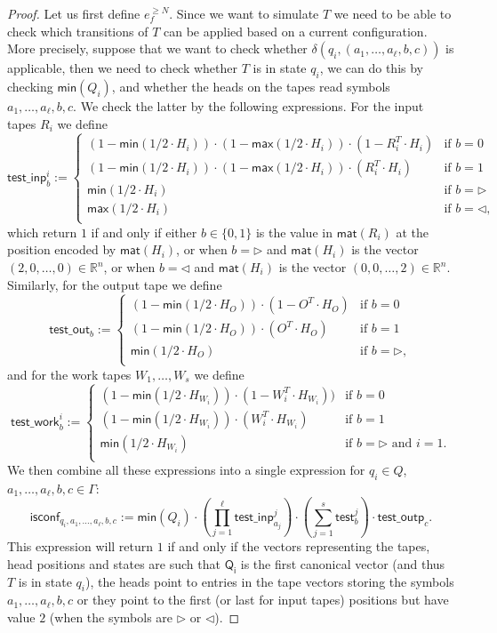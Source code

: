 \begin{proof}
Let us first define $e_f^{\geq N}$. Since we want to simulate $T$ we need to be able to check which 
transitions of $T$ can be applied based on a current configuration. More precisely,
suppose that we want to check whether $\delta(q_i,(a_1,\ldots,a_{\ell},b,c))$ is applicable, then we 
need to check whether $T$ is in state $q_i$, we can do this by checking 
$\mathsf{min}(Q_i)$, and whether the heads on the tapes read symbols $a_1,\ldots,a_{\ell},b,c$. We 
check the latter by the following expressions.
For the input tapes $R_i$ we define
$$
\mathsf{test\_inp}^i_b:=\begin{cases}
(1-\mathsf{min}(1/2\cdot H_i))\cdot(1-\mathsf{max}(1/2\cdot H_i))\cdot(1- R_i^T\cdot H_i) & \text{if $b=0$}\\
(1-\mathsf{min}(1/2\cdot H_i))\cdot(1-\mathsf{max}(1/2\cdot H_i))\cdot(R_i^T\cdot H_i) & \text{if $b=1$}\\
\mathsf{min}(1/2\cdot H_i) & \text{if $b=\rhd$}\\
\mathsf{max}(1/2\cdot H_i) & \text{if $b=\lhd$},\\
\end{cases}
$$
which return $1$ if and only if either $b\in\{0,1\}$ is the value in $\mathsf{mat}(R_i)$ at the 
position encoded by $\mathsf{mat}(H_i)$, or when $b=\rhd$ and $\mathsf{mat}(H_i)$ is the vector 
$(2,0,\ldots,0)\in\mathbb{R}^n$, or when $b=\lhd$ and $\mathsf{mat}(H_i)$ is the vector 
$(0,0,\ldots,2)\in\mathbb{R}^n$. Similarly, for the output tape we define
$$
\mathsf{test\_out}_b:=\begin{cases}
(1-\mathsf{min}(1/2\cdot H_O))\cdot(1- O^T\cdot H_O) & \text{if $b=0$}\\
(1-\mathsf{min}(1/2\cdot H_O))\cdot(O^T\cdot H_O) & \text{if $b=1$}\\
\mathsf{min}(1/2\cdot H_O) & \text{if $b=\rhd$},\\
\end{cases}
$$
and for the work tapes $W_1,\ldots,W_s$ we define
$$
\mathsf{test\_work}^i_b:=\begin{cases}
(1-\mathsf{min}(1/2\cdot H_{W_i}))\cdot(1- W_i^T\cdot H_{W_i})) & \text{if $b=0$}\\
(1-\mathsf{min}(1/2\cdot H_{W_i}))\cdot (W_i^T\cdot H_{W_i}) & \text{if $b=1$}\\
\mathsf{min}(1/2\cdot H_{W_i}) & \text{if $b=\rhd$ and $i=1$}.\\
\end{cases}
$$
We then combine all these expressions into a single expression for $q_i\in Q$, 
$a_1,\ldots,a_\ell,b,c\in\Gamma$:
$$
\mathsf{isconf}_{q_i,a_1,\ldots,a_\ell,b,c}:=
\mathsf{min}(Q_i)\cdot \left(\prod_{j=1}^{\ell} \mathsf{test\_inp}_{a_j}^j\right)
\cdot\left(\sum_{j=1}^s \mathsf{test}_b^j\right)\cdot \mathsf{test\_outp}_{c}.
$$
This expression will return $1$ if and only if the vectors representing the tapes, 
head positions and states are such that $\mathsf{Q_i}$ is the first canonical vector 
(and thus $T$ is in state $q_i$), the heads point to entries in the tape vectors storing 
the symbols $a_1,\ldots,a_{\ell}, b,c$ or they point to the first (or last for input tapes) 
positions but have value $2$ (when the symbols are $\rhd$ or $\lhd$). 


\end{proof}
